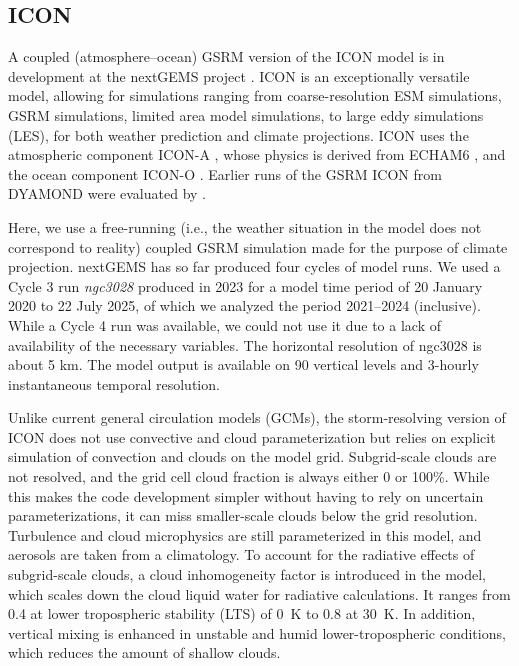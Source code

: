 \documentclass[draft]{agujournal2019}
\begin{document}
\subsection{ICON}
\label{sec:icon}

A coupled (atmosphere--ocean) GSRM version of the ICON model is in development at the nextGEMS project \cite{hohenegger2023}. ICON is an exceptionally versatile model, allowing for simulations ranging from coarse-resolution ESM simulations, GSRM simulations, limited area model simulations, to large eddy simulations (LES), for both weather prediction and climate projections. ICON uses the atmospheric component ICON-A \cite{giorgetta2018}, whose physics is derived from ECHAM6 \cite{stevens2013}, and the ocean component ICON-O \cite{korn2022}. Earlier runs of the GSRM ICON from DYAMOND were evaluated by .

Here, we use a free-running (i.e., the weather situation in the model does not correspond to reality) coupled GSRM simulation made for the purpose of climate projection. nextGEMS has so far produced four cycles of model runs. We used a Cycle 3 run \emph{ngc3028} produced in 2023 \cite{nextgems2023a,nextgems2023b} for a model time period of 20 January 2020 to 22 July 2025, of which we analyzed the period 2021--2024 (inclusive). While a Cycle 4 run was available, we could not use it due to a lack of availability of the necessary variables. The horizontal resolution of ngc3028 is about 5 km. The model output is available on 90 vertical levels and 3-hourly instantaneous temporal resolution.

Unlike current general circulation models (GCMs), the storm-resolving version of ICON does not use convective and cloud parameterization but relies on explicit simulation of convection and clouds on the model grid. Subgrid-scale clouds are not resolved, and the grid cell cloud fraction is always either 0 or 100\%. While this makes the code development simpler without having to rely on uncertain parameterizations, it can miss smaller-scale clouds below the grid resolution. Turbulence and cloud microphysics are still parameterized in this model, and aerosols are taken from a climatology. To account for the radiative effects of subgrid-scale clouds, a cloud inhomogeneity factor is introduced in the model, which scales down the cloud liquid water for radiative calculations. It ranges from 0.4 at lower tropospheric stability (LTS) of 0~K to 0.8 at 30~K. In addition, vertical mixing is enhanced in unstable and humid lower-tropospheric conditions, which reduces the amount of shallow clouds.
\end{document}
